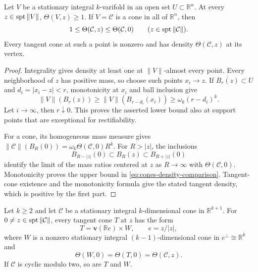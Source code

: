 \begin{lemma}\label{lem:cones-density}
Let $V$ be a stationary integral $k$-varifold in an open set
$U\subset\mathbb R^n$.  At every $z\in\operatorname{spt}\|V\|$,
$\Theta(V,z)\geq1$.  If $V=\mathcal C$ is a cone in all of
$\mathbb R^n$, then
\begin{equation}\label{eq:cones-density-comparison}
 1\leq\Theta(\mathcal C,z)\leq\Theta(\mathcal C,0)
 \qquad (z\in\operatorname{spt}\|\mathcal C\|).
\end{equation}
Every tangent cone at such a point is nonzero and has density
$\Theta(\mathcal C,z)$ at its vertex.
\end{lemma}

\begin{proof}
Integrality gives density at least one at $\|V\|$-almost every point.
Every neighborhood of $z$ has positive mass, so choose such points
$x_i\to z$.  If $\overline{B_r(z)}\subset U$ and
$d_i=|x_i-z|<r$, monotonicity at $x_i$ and ball inclusion give
\[
 \|V\|(B_r(z))\geq\|V\|(B_{r-d_i}(x_i))
       \geq\omega_k(r-d_i)^k.
\]
Let $i\to\infty$, then $r\downarrow0$.  This proves the asserted
lower bound also at support points that are exceptional for
rectifiability.

For a cone, its homogeneous mass measure gives
$\|\mathcal C\|(B_R(0))=\omega_k\Theta(\mathcal C,0)R^k$.
For $R>|z|$, the inclusions
\[
 B_{R-|z|}(0)\subset B_R(z)\subset B_{R+|z|}(0)
\]
identify the limit of the mass ratios centered at $z$ as
$R\to\infty$ with $\Theta(\mathcal C,0)$.
Monotonicity proves the upper bound in
\eqref{eq:cones-density-comparison}.  Tangent-cone existence and
the monotonicity formula give the stated tangent density, which is
positive by the first part.
\end{proof}

\begin{lemma}\label{lem:cones-splitting}
Let $k\geq2$ and let $\mathcal C$ be a stationary integral
$k$-dimensional cone in $\mathbb R^{k+1}$.
For $0\ne z\in\operatorname{spt}\|\mathcal C\|$, every tangent cone $T$ at $z$
has the form
\[
 T=\mathbf v(\mathbb Re)\times W,\qquad e=z/|z|,
\]
where $W$ is a nonzero stationary integral $(k-1)$-dimensional
cone in $e^\perp\cong\mathbb R^k$ and
\begin{equation}\label{eq:cones-factor-density}
 \Theta(W,0)=\Theta(T,0)=\Theta(\mathcal C,z).
\end{equation}
If $\mathcal C$ is cyclic modulo two, so are $T$ and $W$.
\end{lemma}

